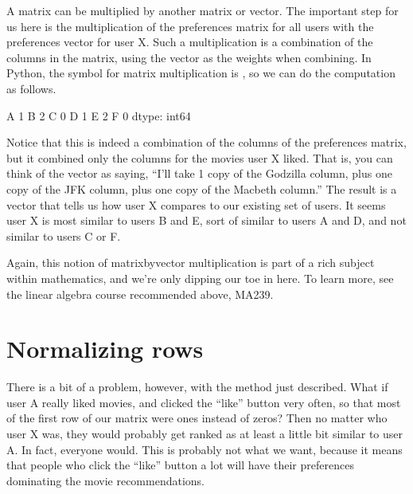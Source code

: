 \documentclass[letterpaper,10pt,english]{jupyterBook}
\begin{document}
\sphinxAtStartPar
A matrix can be multiplied by another matrix or vector.  The important step for us here is the multiplication of the preferences matrix for all users with the preferences vector for user X.  Such a multiplication is a combination of the columns in the matrix, using the vector as the weights when combining.  In Python, the symbol for matrix multiplication is , so we can do the computation as follows.

\begin{sphinxVerbatim}[commandchars=\\\{\}]
  
\end{sphinxVerbatim}

\begin{sphinxVerbatim}[commandchars=\\\{\}]
A    1
B    2
C    0
D    1
E    2
F    0
dtype: int64
\end{sphinxVerbatim}

\sphinxAtStartPar
Notice that this is indeed a combination of the columns of the preferences matrix, but it combined only the columns for the movies user X liked.  That is, you can think of the  vector as saying, “I’ll take 1 copy of the Godzilla column, plus one copy of the JFK column, plus one copy of the Macbeth column.”  The result is a vector that tells us how user X compares to our existing set of users.  It seems user X is most similar to users B and E, sort of similar to users A and D, and not similar to users C or F.

\sphinxAtStartPar
Again, this notion of matrix\sphinxhyphen{}by\sphinxhyphen{}vector multiplication is part of a rich subject within mathematics, and we’re only dipping our toe in here.  To learn more, see the linear algebra course recommended above, MA239.


\section{Normalizing rows}
\label{\detokenize{chapter-16-matrices:normalizing-rows}}
\sphinxAtStartPar
There is a bit of a problem, however, with the method just described.  What if user A really liked movies, and clicked the “like” button very often, so that most of the first row of our matrix were ones instead of zeros?  Then no matter who user X was, they would probably get ranked as at least a little bit similar to user A.  In fact, everyone would.  This is probably not what we want, because it means that people who click the “like” button a lot will have their preferences dominating the movie recommendations.
\end{document}
